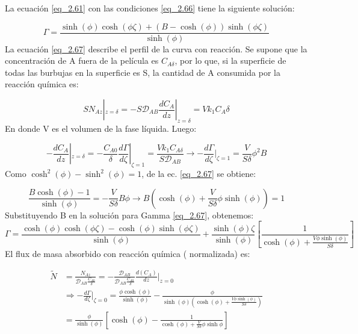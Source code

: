 La ecuación \eqref{eq_2.61} con las condiciones \eqref{eq_2.66} tiene la siguiente solución:

\begin{equation}
    \Gamma=\frac{\sinh(\phi)\cosh(\phi\zeta)+(B-\cosh(\phi))\sinh(\phi\zeta)}{\sinh(\phi)}
    \label{eq_2.67}
\end{equation}
La ecuación \eqref{eq_2.67} describe el perfil de la curva con reacción. Se supone que la concentración de A fuera de la película es $C_{A\delta}$, por lo que, si la superficie de todas las burbujas en la superficie es S, la cantidad de A consumida por la reacción química es:

\begin{equation}
    SN_{Az}|_{z=\delta}=-S\mathscr{D}_{AB}\frac{dC_A}{dz}|_{z=\delta}=Vk_1C_A\delta
    \label{eq_2.68}
\end{equation}
En donde V es el volumen de la fase líquida.
Luego:

\begin{equation*}
    -\frac{dC_A}{dz}|_{z=\delta}=-\frac{C_{A0}}{\delta}\frac{d\Gamma}{d\zeta}|_{\zeta=1}=\frac{Vk_1C_{A\delta}}{S\mathscr{D}_{AB}}\longrightarrow-\frac{d\Gamma}{d\zeta}|_{\zeta=1}=\frac{V}{S\delta}\phi^2B
\end{equation*}
Como $\cosh^2(\phi)-\sinh^2(\phi)=1$, de la ec. \eqref{eq_2.67} se obtiene:

\begin{equation*}
    \frac{B\cosh(\phi)-1}{\sinh(\phi)}=-\frac{V}{S\delta}B\phi\longrightarrow B(\cosh(\phi)+\frac{V}{S\delta}\phi\sinh(\phi))=1
\end{equation*}
Substituyendo B en la solución para Gamma \eqref{eq_2.67}, obtenemos:
\begin{equation}
    \Gamma=\frac{\cosh(\phi)\cosh(\phi\zeta)-\cosh(\phi)\sinh(\phi\zeta)}{\sinh(\phi)}+\frac{\sinh(\phi)\zeta}{\sinh(\phi)}[\frac{1}{\cosh(\phi)+\frac{V\phi\sinh(\phi)}{S\delta}}]
    \label{eq_2.69}
\end{equation}
El flux de masa absorbido con reacción química ( normalizada) es:

\begin{equation}
\begin{split}
    \widetilde{N} &= \frac{N_{Az}}{\mathscr{D}_{AB}\frac{C_{A0}}{\delta}} = -\frac{\mathscr{D}_{AB}}{\mathscr{D}_{AB}\frac{C_{A0}}{\delta}} \frac{d(C_A)}{dz}\bigg|_{z=0} \\
    &\Rightarrow -\frac{d\Gamma}{d\zeta}\bigg|_{\zeta=0} = \frac{\phi \cosh(\phi)}{\sinh(\phi)} - \frac{\phi}{\sinh(\phi)\left(\cosh(\phi) + \frac{V\phi \sinh(\phi)}{S\delta}\right)} \\
    &= \frac{\phi}{\sinh(\phi)}\left[\cosh(\phi) - \frac{1}{\cosh(\phi) + \frac{V}{S\delta}\phi \sinh{\phi}}\right]
\end{split}
\label{eq_2.70}
\end{equation}

